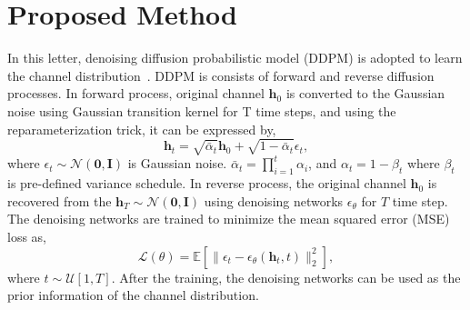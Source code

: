 \documentclass[lettersize,journal]{IEEEtran}
\begin{document}
\section{Proposed Method}

In this letter, denoising diffusion probabilistic model (DDPM) is adopted to learn the channel distribution~\cite{hoDenoisingDiffusionProbabilistic2020}. DDPM is consists of forward and reverse diffusion processes. In forward process, original channel $\mathbf{h}_{0}$ is converted to the Gaussian noise using Gaussian transition kernel for T time steps, and using the reparameterization trick, it can be expressed by,
\begin{equation}
\mathbf{h}_{t} = \sqrt{ \bar{\alpha}_{t} }\mathbf{h}_{0} + \sqrt{ 1-\bar{\alpha}_{t} }\epsilon_{t},
\end{equation}
where $\epsilon_{t}\sim\mathcal{N}(\mathbf{0},\mathbf{I})$ is Gaussian noise. $\bar{\alpha}_{t}=\prod_{i=1}^{t}\alpha_{i}$, and $\alpha_{t}=1-\beta_{t}$ where $\beta_{t}$ is pre-defined variance schedule. In reverse process, the original channel $\mathbf{h}_{0}$ is recovered from the $\mathbf{h}_{T}\sim\mathcal{N}(\mathbf{0},\mathbf{I})$ using denoising networks $\epsilon_{\theta}$ for $T$ time step. The denoising networks are trained to minimize the mean squared error (MSE) loss as,
\begin{equation}
\mathcal{L}(\theta) = \mathbb{E}[\|\epsilon_{t} - \epsilon_{\theta}(\mathbf{h}_{t},t)\|_{2}^{2}],
\end{equation}
where $t\sim\mathcal{U}[1,T]$. After the training, the denoising networks can be used as the prior information of the channel distribution.
\end{document}
